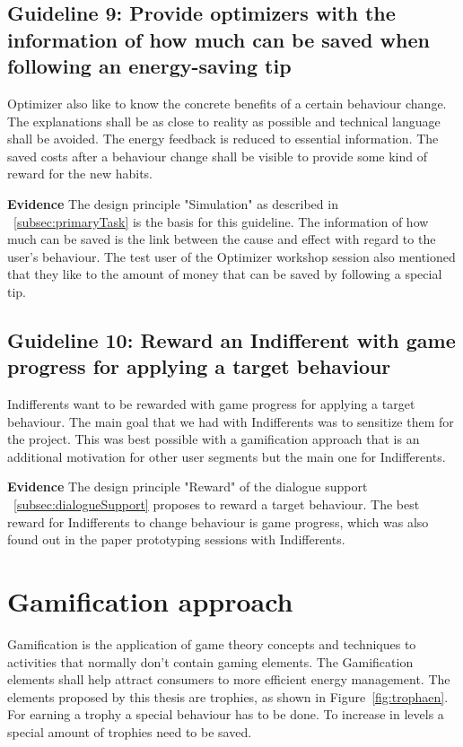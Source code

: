 \subsection*{Guideline 9: Provide optimizers with the information of how much can be saved when following an energy-saving tip}

Optimizer also like to know the concrete benefits of a certain behaviour change. The explanations shall be as close to reality as possible and technical language shall be avoided. The energy feedback is reduced to essential information. The saved costs after a behaviour change shall be visible to provide some kind of reward for the new habits.

\textbf{Evidence} \quad The design principle "Simulation" as described in ~\ref{subsec:primaryTask} is the basis for this guideline. The information of how much can be saved is the link between the cause and effect with regard to the user's behaviour. The test user of the Optimizer workshop session also mentioned that they like to the amount of money that can be saved by following a special tip.

\subsection*{Guideline 10: Reward an Indifferent with game progress for applying a target behaviour}

Indifferents want to be rewarded with game progress for applying a target behaviour. The main goal that we had with Indifferents was to sensitize them for the project. This was best possible with a gamification approach that is an additional motivation for other user segments but the main one for Indifferents.

\textbf{Evidence} \quad The design principle "Reward" of the dialogue support  ~\ref{subsec:dialogueSupport} proposes to reward a target behaviour. The best reward for Indifferents to change behaviour is game progress, which was also found out in the paper prototyping sessions with Indifferents.


\section{Gamification approach}

Gamification is the application of game theory concepts and techniques to activities that normally don't contain gaming elements. The Gamification elements shall help attract consumers to more efficient energy management. The elements proposed by this thesis are trophies, as shown in Figure~\ref{fig:trophaen}. For earning a trophy a special behaviour has to be done. To increase in levels a special amount of trophies need to be saved.

